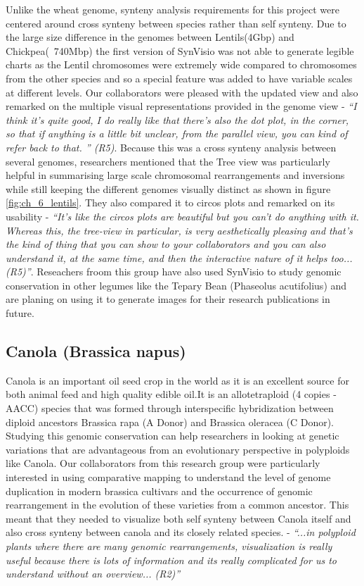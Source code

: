 Unlike the wheat genome, synteny analysis requirements for this project were centered around cross synteny between species rather than self synteny. Due to the large size difference in the genomes between Lentils(4Gbp) and Chickpea(~740Mbp) the first version of SynVisio was not able to generate legible charts as the Lentil chromosomes were extremely wide compared to chromosomes from the other species and so a special feature was added to have variable scales at different levels. Our collaborators were pleased with the updated view and also remarked on the multiple visual representations provided in the genome view - \textit{``I think it's quite good, I do really like that there's also the dot plot, in the corner, so that if anything is a little bit unclear, from the parallel view, you can kind of refer back to that.
'' (R5)}. Because this was a cross synteny analysis between several genomes, researchers mentioned that the Tree view was particularly helpful in summarising large scale chromosomal rearrangements and inversions while still keeping the different genomes visually distinct as shown in figure \ref{fig:ch_6_lentils}. They also compared it to circos plots and remarked on its usability - \textit{``It's like the circos plots are beautiful but you can't do anything with it. Whereas this, the tree-view in particular, is very aesthetically pleasing and that's the kind of thing that you can show to your collaborators and you can also understand it, at the same time, and then the interactive nature of it helps too...
(R5)''}. Reseachers froom this group have also used SynVisio to study genomic conservation in other legumes like the Tepary Bean (Phaseolus acutifolius) and are planing on using it to generate images for their research publications in future.

\subsection{Canola (Brassica napus)}
Canola is an important oil seed crop in the world as it is an excellent source for both animal feed and high quality edible oil\cite{shahidi1990canola}.It is an allotetraploid (4 copies - AACC) species that was formed through interspecific hybridization between diploid ancestors Brassica rapa (A Donor) and Brassica oleracea (C Donor)\cite{parkin1995identification}. Studying this genomic conservation can help researchers in looking at genetic variations that are advantageous from an evolutionary perspective in polyploids like Canola. Our collaborators from this research group were particularly interested in using comparative mapping to understand the level of genome duplication in modern brassica cultivars and the occurrence of genomic rearrangement in the evolution of these varieties from a common ancestor. This meant that they needed to visualize both self synteny between Canola itself and also cross synteny between canola and its closely related species. - \textit{``...in polyploid plants where there are many genomic rearrangements, visualization is really useful because there is lots of information and its really complicated for us to understand without an overview... (R2)''}

